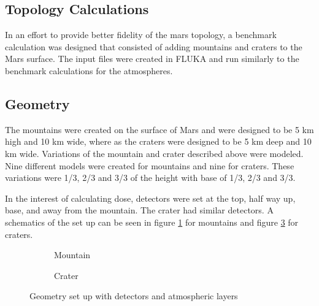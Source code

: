 \subsection{Topology Calculations}
In an effort to provide better fidelity of the mars topology, a benchmark calculation was 
designed that consisted of adding mountains and craters to the Mars surface. 
The input files were created in FLUKA and run similarly to the benchmark calculations 
for the atmospheres. 

\subsection*{Geometry}
The mountains were created on the surface of Mars and were designed to be 5 km high 
and 10 km wide, where as the craters were designed to be 5 km deep and 10 km wide. 
Variations of the mountain and crater described above were modeled. Nine different 
models were created for mountains and nine for craters. 
These variations were 1/3, 2/3 and 3/3 of the height with base of 1/3, 2/3 and 3/3. 

In the interest of calculating dose, detectors were set at the top, half way up, base, 
and away from the mountain. The crater had similar detectors. A schematics of the set up 
can be seen in figure \ref{setup_mountain} for mountains and 
figure \ref{setup_crater} for craters.

\begin{figure}[h]
\centering
\begin{subfigure}[b]{.45\textwidth}
\caption{Mountain}
\label{setup_mountain}
\end{subfigure}
%
\hspace{0.10cm}
%
\begin{subfigure}[b]{.4\textwidth}
\centering
{}
\caption{Crater}
\label{setup_crater}
\end{subfigure}
\caption{Geometry set up with detectors and atmospheric layers}
\end{figure}


